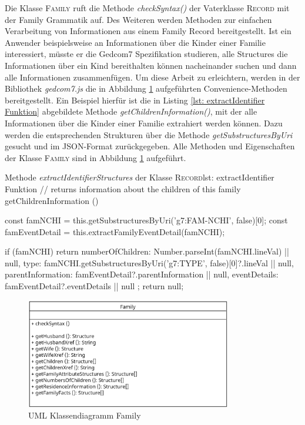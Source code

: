 Die Klasse \textsc{Family} ruft die Methode \textit{checkSyntax()} der Vaterklasse \textsc{Record} mit der Family Grammatik auf. Des Weiteren werden Methoden zur einfachen Verarbeitung von Informationen aus einem Family Record bereitgestellt. Ist ein Anwender beispielsweise an Informationen über die Kinder einer Familie interessiert, müsste er die Gedcom7 Spezifikation studieren, alle Structures die Informationen über ein Kind bereithalten können nacheinander suchen und dann alle Informationen zusammenfügen. Um diese Arbeit zu erleichtern, werden in der Bibliothek \textit{gedcom7.js} die in Abbildung \ref{fig: UML Klassendiagramm Family} aufgeführten Convenience-Methoden bereitgestellt. Ein Beispiel hierfür ist die in Listing \ref{lst: extractIdentifier Funktion} abgebildete Methode \textit{getChildrenInformation()}, mit der alle Informationen über die Kinder einer Familie extrahiert werden können. Dazu werden die entsprechenden Strukturen über die Methode \textit{getSubstructuresByUri} gesucht und im JSON-Format zurückgegeben. Alle Methoden und Eigenschaften der Klasse \textsc{Family} sind in Abbildung \ref{fig: UML Klassendiagramm Family} aufgeführt.
\vspace{1em}
\begin{javascript}{Methode \textit{extractIdentifierStructures} der Klasse \textsc{Record}}{lst: extractIdentifier Funktion}
	// returns information about the children of this family
	getChildrenInformation () {
		const famNCHI = this.getSubstructuresByUri('g7:FAM-NCHI', false)[0];
		const famEventDetail = this.extractFamilyEventDetail(famNCHI);
		
		if (famNCHI) {
			return {
				numberOfChildren: Number.parseInt(famNCHI.lineVal) || null,
				type: famNCHI.getSubstructuresByUri('g7:TYPE', false)[0]?.lineVal || null,
				parentInformation: famEventDetail?.parentInformation || null,
				eventDetails: famEventDetail?.eventDetails || null
			};
		}
		return null;
	}
\end{javascript}

\begin{figure}[h]
	\centering
	\includegraphics[width=0.8\textwidth]{images/UML_Class_Family.png}
	\caption{UML Klassendiagramm Family}
	\label{fig: UML Klassendiagramm Family}
\end{figure}
\newpage
